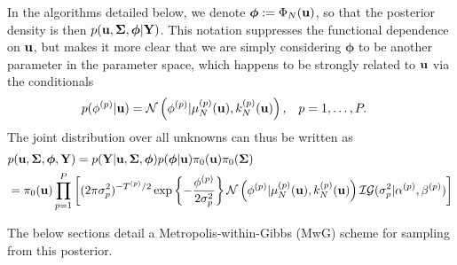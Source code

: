 \documentclass[12pt]{article}
\newcommand{\bphi}{\boldsymbol{\phi}}
\begin{document}
In the algorithms detailed below, we denote $\bphi := \indexDesign[\Ndesign]{\SSR}(\bpar)$, so that the posterior density is then $p(\bpar, \CovObs, \bphi | \stateMat)$. This notation suppresses 
the functional dependence on $\mathbf{u}$, but makes it more clear that we are simply considering $\bphi$ to be another parameter in the parameter space, which happens to be strongly 
related to $\mathbf{u}$ via the conditionals
\begin{align*}
&p({\phi}^{(p)} | \mathbf{u}) = \mathcal{N}\left({\phi}^{(p)} | \mu_{N}^{(p)}(\mathbf{u}), k_{N}^{(p)}(\mathbf{u}) \right), &&p = 1, \dots, P.
\end{align*}
The joint distribution over all unknowns can thus be written as
\begin{align}
&p(\bpar, \CovObs, \bphi, \stateMat) = 
p(\stateMat | \bpar, \CovObs, \bphi)p(\bphi | \bpar) \priorDens(\bpar) \priorDens(\CovObs) \\
&= \priorDens(\bpar) \prod_{\objIdx=1}^{\Nobj} \left[(2\pi\sdObs^2_{\objIdx})^{-\indexObj{\Ntime}/2} \exp\left\{-\frac{\indexObj{\phi} }{2\sdObs^2_{\objIdx}} \right\} 
\Gaussian\left(\indexObj{\phi}  | \GPMeanPredOut{\Ndesign}{\objIdx}(\bpar), \GPKerPredOut{\Ndesign}{\objIdx}(\bpar)\right) \mathcal{IG}(\sdObs^2_{\objIdx}| \indexObj{\IGShape}, \indexObj{\IGScale}) \right] \nonumber
\end{align}

The below sections detail a Metropolis-within-Gibbs (MwG) scheme for sampling from this posterior. 

\end{document}
